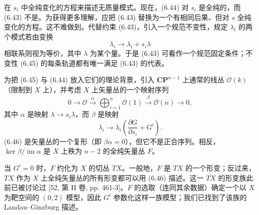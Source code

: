 
\label{op:85}
在 $s_i$ 中全纯变化的方程来描述无质量模式。现在，(6.44) 对 $s_i$ 是全纯的，而 (6.43) 不是。为获得更多理解，应把 (6.43) 替换为一个有相同后果、但对 $s$ 全纯变化的方程。这不难做到。代替约束 (6.43)，引入一个规范不变性，规定 $\lambda_i$ 的两个模式若由变换
\begin{equation}\tag{6.45}
\lambda_i\to\lambda_i+s_i\lambda
\end{equation}
相联系则视为等价，其中 $\lambda$ 为某个量。于是 (6.43) 可看作一个规范固定条件；不变性 (6.45) 的每条轨道都有唯一满足 (6.43) 的代表。

为把 (6.45) 与 (6.44) 放入它们的理论背景，引入 $\mathbf{CP}^{n-1}$ 上通常的线丛 $\mathcal{O}(k)$（限制到 $X$ 上），并考虑 $X$ 上矢量丛的一个映射序列
\begin{equation}\tag{6.46}
0\to\mathcal{O}\xrightarrow{\ \alpha\ }\bigoplus_{i=1}^{n}\mathcal{O}(1)\xrightarrow{\ \beta\ }\mathcal{O}(n)\to0,
\end{equation}
其中 $\alpha$ 是映射 $\lambda\to s_i\lambda$，而 $\beta$ 是映射
\begin{equation}\tag{6.47}
\lambda_i\to\lambda_i\left(\frac{\partial G}{\partial s_i}+G^i\right).
\end{equation}
(6.46) 是矢量丛的一个复形（即 $\beta\alpha=0$），但它不是正合序列。相反，$\ker\beta/\operatorname{im}\alpha$ 是 $X$ 上秩为 $n-2$ 的全纯矢量丛 $F$。


当 $G^i=0$ 时，$F$ 约化为 $X$ 的切丛 $TX$。一般地，$F$ 是 $TX$ 的一个形变；反过来，$TX$ 作为 $X$ 上全纯矢量丛的所有形变都可以用 (6.46) 描述。这一 $TX$ 的形变族此前已被讨论过 [52, 第 II 卷, pp. 461-3]。$F$ 的选取（连同其余数据）确定一个以 $X$ 为靶空间的 $(0,2)$ 模型，因此 $G^i$ 参数化这样一族模型；我们已找到了该族的 Landau--Ginzburg 描述。

